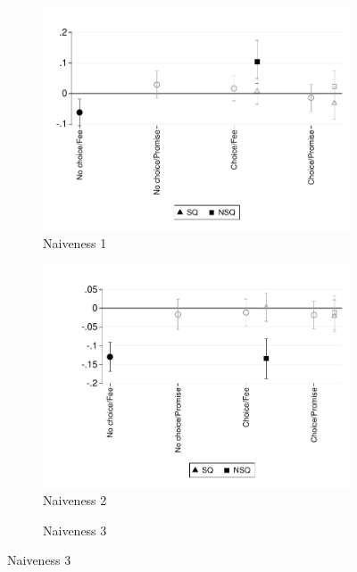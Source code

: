 \documentclass[11pt]{article}
\begin{document}
\begin{figure}[H]
    \caption{Treatment effect - naiveness}
    \label{te_naiveness}
    \begin{center}
    \begin{subfigure}{0.45\textwidth}
        \caption{Naiveness 1}
        \centering
        \includegraphics[width=\textwidth]{Figuras/te_graph_ref_c.pdf}
    \end{subfigure}
    \begin{subfigure}{0.45\textwidth}
        \caption{Naiveness 2}
        \centering
        \includegraphics[width=\textwidth]{Figuras/te_graph_ref_default.pdf}
    \end{subfigure}
        \begin{subfigure}{0.45\textwidth}
        \caption{Naiveness 3}

\end{subfigure}
\end{center}
\end{figure}
\end{document}
